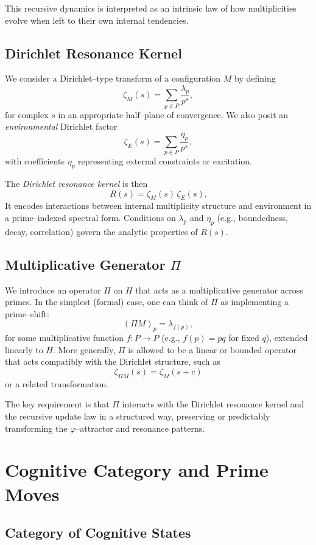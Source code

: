\documentclass[11pt]{article}
\begin{document}
This recursive dynamics is interpreted as an intrinsic law of how multiplicities evolve when left to their own internal tendencies.

\subsection{Dirichlet Resonance Kernel}

We consider a Dirichlet--type transform of a configuration $M$ by defining
\[
\zeta_M(s) = \sum_{p\in P} \frac{\lambda_p}{p^s},
\]
for complex $s$ in an appropriate half--plane of convergence.
We also posit an \emph{environmental} Dirichlet factor
\[
\zeta_E(s) = \sum_{p\in P} \frac{\eta_p}{p^s},
\]
with coefficients $\eta_p$ representing external constraints or excitation.

The \emph{Dirichlet resonance kernel} is then
\[
R(s) = \zeta_M(s)\,\zeta_E(s).
\]
It encodes interactions between internal multiplicity structure and environment in a prime--indexed spectral form.
Conditions on $\lambda_p$ and $\eta_p$ (e.g., boundedness, decay, correlation) govern the analytic properties of $R(s)$.

\subsection{Multiplicative Generator $\Pi$}

We introduce an operator $\Pi$ on $H$ that acts as a multiplicative generator across primes.
In the simplest (formal) case, one can think of $\Pi$ as implementing a prime--shift:
\[
(\Pi M)_p = \lambda_{f(p)},
\]
for some multiplicative function $f:P\to P$ (e.g., $f(p) = pq$ for fixed $q$), extended linearly to $H$.
More generally, $\Pi$ is allowed to be a linear or bounded operator that acts compatibly with the Dirichlet structure, such as
\[
\zeta_{\Pi M}(s) = \zeta_M(s + c)
\]
or a related transformation.

The key requirement is that $\Pi$ interacts with the Dirichlet resonance kernel and the recursive update law in a structured way, preserving or predictably transforming the $\varphi$--attractor and resonance patterns.

\section{Cognitive Category and Prime Moves}

\subsection{Category of Cognitive States}
\end{document}
